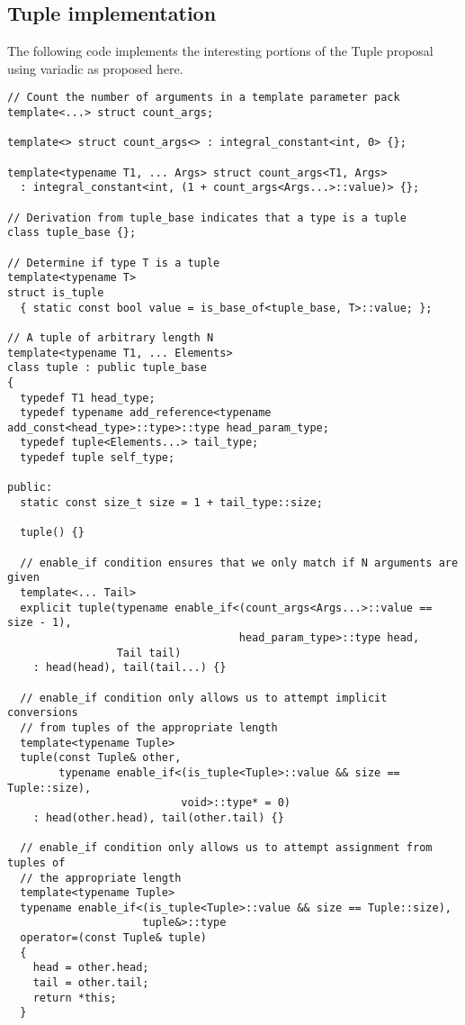 \documentclass{article}
\begin{document}
\subsection{Tuple implementation}
\label{tupleimpl}
The following code implements the interesting portions of the Tuple
proposal~\cite{Jarvi02} using variadic as proposed here. 

\small
\begin{verbatim}
// Count the number of arguments in a template parameter pack
template<...> struct count_args;

template<> struct count_args<> : integral_constant<int, 0> {};

template<typename T1, ... Args> struct count_args<T1, Args>
  : integral_constant<int, (1 + count_args<Args...>::value)> {};

// Derivation from tuple_base indicates that a type is a tuple
class tuple_base {};

// Determine if type T is a tuple
template<typename T>
struct is_tuple
  { static const bool value = is_base_of<tuple_base, T>::value; };

// A tuple of arbitrary length N
template<typename T1, ... Elements>
class tuple : public tuple_base 
{
  typedef T1 head_type;
  typedef typename add_reference<typename add_const<head_type>::type>::type head_param_type;
  typedef tuple<Elements...> tail_type;
  typedef tuple self_type;

public:
  static const size_t size = 1 + tail_type::size;

  tuple() {}

  // enable_if condition ensures that we only match if N arguments are given
  template<... Tail> 
  explicit tuple(typename enable_if<(count_args<Args...>::value == size - 1),
                                    head_param_type>::type head,
                 Tail tail)
    : head(head), tail(tail...) {}

  // enable_if condition only allows us to attempt implicit conversions
  // from tuples of the appropriate length
  template<typename Tuple>
  tuple(const Tuple& other,
        typename enable_if<(is_tuple<Tuple>::value && size == Tuple::size), 
                           void>::type* = 0)
    : head(other.head), tail(other.tail) {}

  // enable_if condition only allows us to attempt assignment from tuples of
  // the appropriate length
  template<typename Tuple>
  typename enable_if<(is_tuple<Tuple>::value && size == Tuple::size),
                     tuple&>::type
  operator=(const Tuple& tuple)
  {
    head = other.head;
    tail = other.tail;
    return *this;
  }


\end{verbatim}
\end{document}

